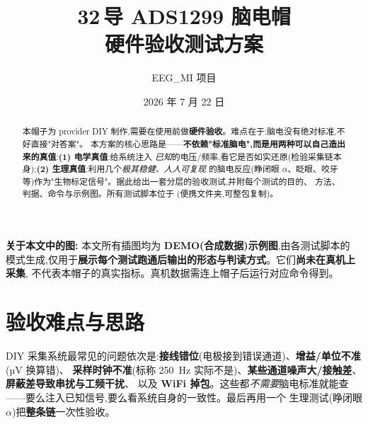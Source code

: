 \documentclass[11pt]{ctexart}
\title{\bfseries 32\,导 ADS1299 脑电帽\\硬件验收测试方案}
\author{EEG\_MI 项目}
\date{2026 年 7 月 22 日}
\begin{document}
\maketitle

\begin{mdframed}[linecolor=bad,linewidth=1pt,backgroundcolor=bad!5]
\textbf{\textcolor{bad}{关于本文中的图:}} 本文所有插图均为 \textbf{DEMO(合成数据)示例图},由各测试脚本的
 模式生成,仅用于\textbf{展示每个测试跑通后输出的形态与判读方式}。它们\textbf{尚未在真机上采集},
不代表本帽子的真实指标。真机数据需连上帽子后运行对应命令得到。
\end{mdframed}

\begin{abstract}
\noindent
本帽子为 provider DIY 制作,需要在使用前做\textbf{硬件验收}。难点在于:脑电没有绝对标准,不好直接"对答案"。
本方案的核心思路是——\textbf{不依赖"标准脑电",而是用两种可以自己造出来的真值}:\textbf{(1) 电学真值}:给系统注入
\emph{已知}的电压/频率,看它是否如实还原(检验采集链本身);\textbf{(2) 生理真值}:利用几个\emph{极其稳健、人人可复现}
的脑电反应(睁闭眼 $\alpha$、眨眼、咬牙等)作为"生物标定信号"。据此给出一套分层的验收测试,并附每个测试的目的、
方法、判据、命令与示例图。所有测试脚本位于 (便携文件夹,可整包复制)。
\end{abstract}

\section{验收难点与思路}
DIY 采集系统最常见的问题依次是:\textbf{接线错位}(电极接到错误通道)、\textbf{增益/单位不准}(µV 换算错)、
\textbf{采样时钟不准}(标称 \SI{250}{\hertz} 实际不是)、\textbf{某些通道噪声大/接触差}、\textbf{屏蔽差导致串扰与工频干扰}、
以及 \textbf{WiFi 掉包}。这些都\emph{不需要}脑电标准就能查——要么注入已知信号,要么看系统自身的一致性。最后再用一个
生理测试(睁闭眼 $\alpha$)把\textbf{整条链}一次性验收。
\end{document}
